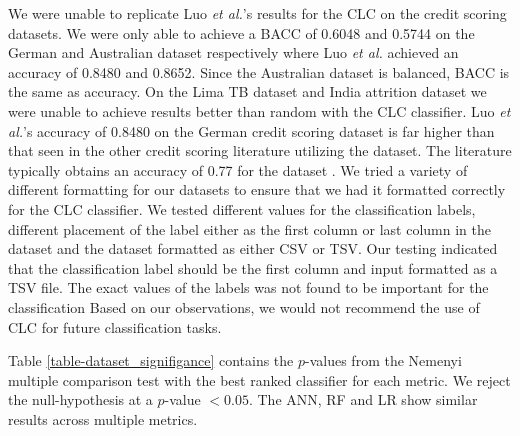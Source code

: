 \documentclass{sig-alternate-05-2015}
\begin{document}
	We were unable to replicate Luo \textit{et al.}'s \cite{Luo20097562} results for the CLC on the credit scoring datasets. We were only able to achieve a BACC of 0.6048 and 0.5744 on the German and Australian dataset respectively where Luo \textit{et al.} achieved an accuracy of 0.8480 and 0.8652. Since the Australian dataset is balanced, BACC is the same as accuracy. On the Lima TB dataset and India attrition dataset we were unable to achieve results better than random with the CLC classifier. Luo \textit{et al.}'s accuracy of 0.8480 on the German credit scoring dataset is far higher than that seen in the other credit scoring literature utilizing the dataset. The literature typically obtains an accuracy of 0.77 for the dataset \cite{Huang2007847, Nanni20093028, Tsai20082639, Wang2011223}. We tried a variety of different formatting for our datasets to ensure that we had it formatted correctly for the CLC classifier. We tested different values for the classification labels, different placement of the label either as the first column or last column in the dataset and the dataset formatted as either CSV or TSV. Our testing indicated that the classification label should be the first column and input formatted as a TSV file. The exact values of the labels was not found to be important for the classification Based on our observations, we would not recommend the use of CLC for future classification tasks.	
	
	Table \ref{table-dataset_signifigance} contains the $p$-values from the Nemenyi multiple comparison test with the best ranked classifier for each metric. We reject the null-hypothesis at a $p$-value $< 0.05$. The ANN, RF and LR show similar results across multiple metrics.
	
\end{document}
